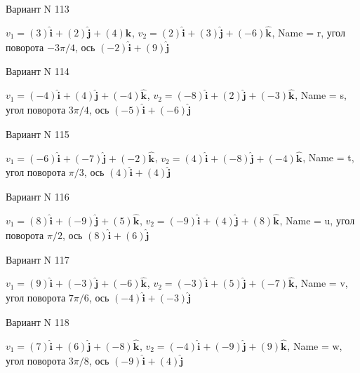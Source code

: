 \documentclass[11pt]{report}
\begin{document}
Вариант N 113

$v_1 = \left(3\right)\mathbf{\hat{i}_{}} + \left(2\right)\mathbf{\hat{j}_{}} + \left(4\right)\mathbf{\hat{k}_{}}$, $v_2 = \left(2\right)\mathbf{\hat{i}_{}} + \left(3\right)\mathbf{\hat{j}_{}} + \left(-6\right)\mathbf{\hat{k}_{}}$, Name = r, угол поворота $- 3 \pi / 4$, ось $\left(-2\right)\mathbf{\hat{i}_{}} + \left(9\right)\mathbf{\hat{j}_{}}$

Вариант N 114

$v_1 = \left(-4\right)\mathbf{\hat{i}_{}} + \left(4\right)\mathbf{\hat{j}_{}} + \left(-4\right)\mathbf{\hat{k}_{}}$, $v_2 = \left(-8\right)\mathbf{\hat{i}_{}} + \left(2\right)\mathbf{\hat{j}_{}} + \left(-3\right)\mathbf{\hat{k}_{}}$, Name = s, угол поворота $3 \pi / 4$, ось $\left(-5\right)\mathbf{\hat{i}_{}} + \left(-6\right)\mathbf{\hat{j}_{}}$

Вариант N 115

$v_1 = \left(-6\right)\mathbf{\hat{i}_{}} + \left(-7\right)\mathbf{\hat{j}_{}} + \left(-2\right)\mathbf{\hat{k}_{}}$, $v_2 = \left(4\right)\mathbf{\hat{i}_{}} + \left(-8\right)\mathbf{\hat{j}_{}} + \left(-4\right)\mathbf{\hat{k}_{}}$, Name = t, угол поворота $\pi / 3$, ось $\left(4\right)\mathbf{\hat{i}_{}} + \left(4\right)\mathbf{\hat{j}_{}}$

Вариант N 116

$v_1 = \left(8\right)\mathbf{\hat{i}_{}} + \left(-9\right)\mathbf{\hat{j}_{}} + \left(5\right)\mathbf{\hat{k}_{}}$, $v_2 = \left(-9\right)\mathbf{\hat{i}_{}} + \left(4\right)\mathbf{\hat{j}_{}} + \left(8\right)\mathbf{\hat{k}_{}}$, Name = u, угол поворота $\pi / 2$, ось $\left(8\right)\mathbf{\hat{i}_{}} + \left(6\right)\mathbf{\hat{j}_{}}$

Вариант N 117

$v_1 = \left(9\right)\mathbf{\hat{i}_{}} + \left(-3\right)\mathbf{\hat{j}_{}} + \left(-6\right)\mathbf{\hat{k}_{}}$, $v_2 = \left(-3\right)\mathbf{\hat{i}_{}} + \left(5\right)\mathbf{\hat{j}_{}} + \left(-7\right)\mathbf{\hat{k}_{}}$, Name = v, угол поворота $7 \pi / 6$, ось $\left(-4\right)\mathbf{\hat{i}_{}} + \left(-3\right)\mathbf{\hat{j}_{}}$

Вариант N 118

$v_1 = \left(7\right)\mathbf{\hat{i}_{}} + \left(6\right)\mathbf{\hat{j}_{}} + \left(-8\right)\mathbf{\hat{k}_{}}$, $v_2 = \left(-4\right)\mathbf{\hat{i}_{}} + \left(-9\right)\mathbf{\hat{j}_{}} + \left(9\right)\mathbf{\hat{k}_{}}$, Name = w, угол поворота $3 \pi / 8$, ось $\left(-9\right)\mathbf{\hat{i}_{}} + \left(4\right)\mathbf{\hat{j}_{}}$
\end{document}
